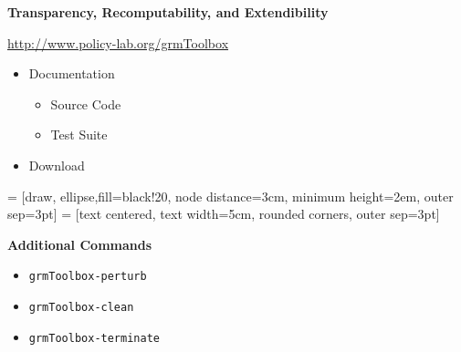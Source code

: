 \begin{frame}
\textbf{Transparency, Recomputability, and Extendibility}

\begin{center}\Large
\href{http://www.policy-lab.org/grmToolbox}{http://www.policy-lab.org/grmToolbox}
\end{center}

\begin{itemize}
\item Documentation\vspace{0.2cm}
\begin{itemize}
\item Source Code\vspace{0.2cm}
\item Test Suite\vspace{0.2cm}
\end{itemize}
\item Download
\end{itemize}

\end{frame}






	\begin{frame}[fragile]
		\begin{center}
		 = [draw, ellipse,fill=black!20, node distance=3cm,
    minimum height=2em, outer sep=3pt]
		 = [text centered, text width=5cm,
	     rounded corners, outer sep=3pt]

		\end{center}
	\end{frame}

\begin{frame}[fragile]
\textbf{Additional Commands}\vspace{0.3cm}
\begin{itemize}
\item \verb+grmToolbox-perturb+\vspace{0.2cm}
\item \verb+grmToolbox-clean+\vspace{0.2cm}
\item \verb+grmToolbox-terminate+
\end{itemize}
\end{frame}

\begin{frame}

\end{frame}